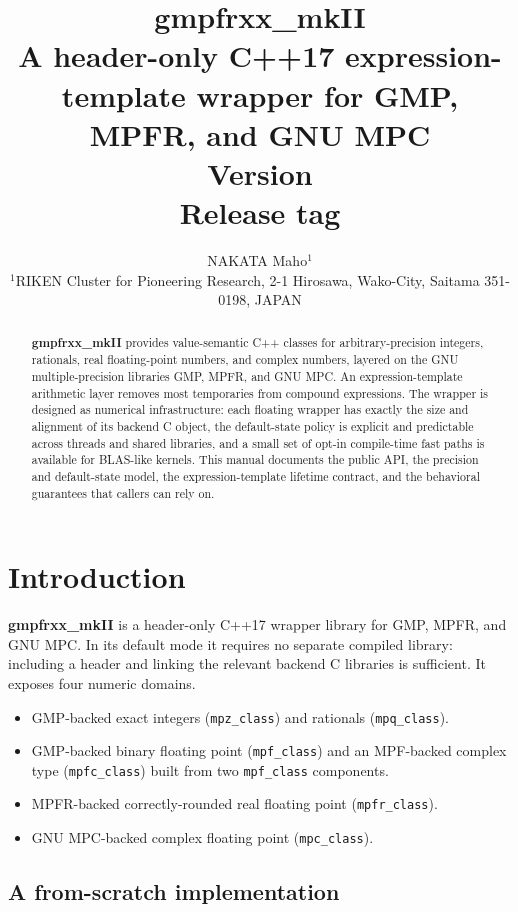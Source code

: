 \documentclass[11pt,a4paper]{article}
\title{\textbf{gmpfrxx\_mkII} \\[0.4em]
  \large A header-only C++17 expression-template wrapper for GMP, MPFR, and GNU MPC \\[0.3em]
  \normalsize Version \manualversion \\[0.2em]
  \normalsize Release tag \manualreleasetag}
\author{NAKATA Maho$^1$\\
  \normalsize
  $^1$RIKEN Cluster for Pioneering Research, 2-1 Hirosawa, Wako-City, Saitama 351-0198, JAPAN}
\date{\manualreleasedate}
\newcommand{\code}[1]{\lstinline!#1!}
\begin{document}
\maketitle

\begin{abstract}
\noindent
\textbf{gmpfrxx\_mkII} provides value-semantic C++ classes for arbitrary-precision
integers, rationals, real floating-point numbers, and complex numbers, layered
on the GNU multiple-precision libraries GMP, MPFR, and GNU MPC. An
expression-template arithmetic layer removes most temporaries from compound
expressions. The wrapper is designed as numerical infrastructure: each floating
wrapper has exactly the size and alignment of its backend C object, the
default-state policy is explicit and predictable across threads and shared
libraries, and a small set of opt-in compile-time fast paths is available for
BLAS-like kernels. This manual documents the public API, the precision and
default-state model, the expression-template lifetime contract, and the
behavioral guarantees that callers can rely on.
\end{abstract}

\tableofcontents
\bigskip

\section{Introduction}

\textbf{gmpfrxx\_mkII} is a header-only C++17 wrapper library for GMP, MPFR, and
GNU MPC. In its default mode it requires no separate compiled library: including
a header and linking the relevant backend C libraries is sufficient. It exposes
four numeric domains.

\begin{itemize}[noitemsep]
  \item GMP-backed exact integers (\code{mpz_class}) and rationals (\code{mpq_class}).
  \item GMP-backed binary floating point (\code{mpf_class}) and an MPF-backed
        complex type (\code{mpfc_class}) built from two \code{mpf_class}
        components.
  \item MPFR-backed correctly-rounded real floating point (\code{mpfr_class}).
  \item GNU MPC-backed complex floating point (\code{mpc_class}).
\end{itemize}

\subsection{A from-scratch implementation}
\end{document}

